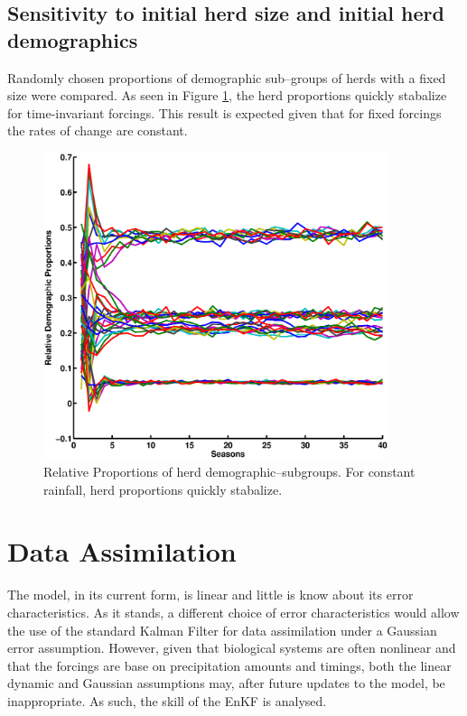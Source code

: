 \documentclass[fleqn, letterpaper]{amsart}
\begin{document}
\subsection{Sensitivity to initial herd size and initial herd demographics}
Randomly chosen proportions of demographic sub--groups of herds with a fixed size were compared. As seen in Figure \ref{relprop}, the herd proportions quickly stabalize for time-invariant forcings. This result is expected given that for fixed forcings the rates of change are constant.
\begin{figure}
\includegraphics[width=0.9\textwidth]{relprop}
\caption{Relative Proportions of herd demographic--subgroups. For constant rainfall, herd proportions quickly stabalize.}
\label{relprop}
\end{figure}

\section{Data Assimilation}
The model, in its current form, is linear and little is know about its error characteristics.
As it stands, a different choice of error characteristics would allow the use of the  standard Kalman Filter for data assimilation under a Gaussian error assumption.
However, given that biological systems are often nonlinear and that the forcings are base on precipitation amounts and timings, both the linear dynamic and Gaussian assumptions may, after future updates to the model, be inappropriate.  As such, the skill of the EnKF is analysed. 
\end{document}
